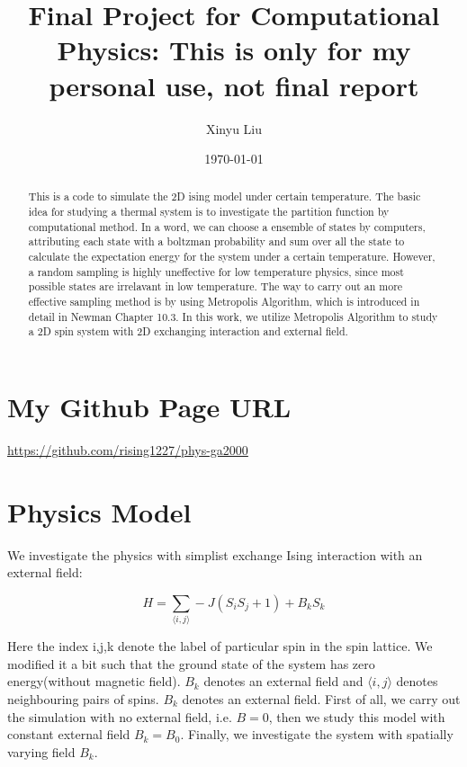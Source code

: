\documentclass[letterpaper,12pt]{article}
\title{Final Project for Computational Physics: This is only for my personal use, not final report}
\date{\today}
\author{Xinyu Liu}
\begin{document}
\maketitle

\begin{abstract}
    This is a code to simulate the 2D ising model under certain temperature. The basic idea for studying a thermal system is to investigate the partition function by computational method. In a word, we can choose a ensemble of states by computers, attributing each state with a boltzman probability and sum over all the state to calculate the expectation energy for the system under a certain temperature. However, a random sampling is highly uneffective for low temperature physics, since most possible states are irrelavant in low temperature. The way to carry out an more effective sampling method is by using Metropolis Algorithm, which is introduced in detail in Newman Chapter 10.3. In this work, we utilize Metropolis Algorithm to study a 2D spin system with 2D exchanging interaction and external field.
\end{abstract}

\tableofcontents



\newpage

\section{My Github Page URL}
\url{https://github.com/rising1227/phys-ga2000}

\section{Physics Model}

We investigate the physics with simplist exchange Ising interaction with an external field:

\begin{equation}
    H = \sum_{\langle i,j \rangle} -J (S_i S_j+1) + B_{k} S_k
\end{equation}

Here the index i,j,k denote the label of particular spin in the spin lattice. We modified it a bit such that the ground state of the system has zero energy(without magnetic field). $B_{k}$ denotes an external field and $\langle i,j \rangle$ denotes neighbouring pairs of spins. $B_{k}$ denotes an external field. First of all, we carry out the simulation with no external field, i.e. $B=0$, then we study this model with constant external field $B_{k} = B_0$. Finally, we investigate the system with spatially varying field $B_k$.
\end{document}
